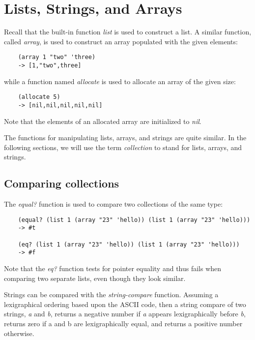 \chapter{Lists, Strings, and Arrays}
\label{ListsStringsArrays}

Recall that the built-in function {\it list} is used to construct a list.
A similar function, called {\it array}, is used to construct an array populated
with the given elements:

\begin{verbatim}
    (array 1 "two" 'three)
    -> [1,"two",three]
\end{verbatim}

while a function named {\it allocate} is used to allocate an array
of the given size:

\begin{verbatim}
    (allocate 5)
    -> [nil,nil,nil,nil,nil]
\end{verbatim}

Note that the elements of an allocated array are initialized to {\it nil}.

The functions for manipulating lists, arrays, and strings are quite
similar. In the following sections, we will use the term {\it collection}
to stand for lists, arrays, and strings.

\section{Comparing collections}

The {\it equal?} function is used to compare two collections of the same type:

\begin{verbatim}
    (equal? (list 1 (array "23" 'hello)) (list 1 (array "23" 'hello)))
    -> #t

    (eq? (list 1 (array "23" 'hello)) (list 1 (array "23" 'hello)))
    -> #f
\end{verbatim}

Note that the {\it eq?} function tests for pointer equality and thus fails
when comparing two separate lists, even though they look similar.

Strings can be compared with the {\it string-compare} function.
Assuming a lexigraphical ordering based upon the ASCII code,
then a string compare of two strings, {\it a} and {\it b},
returns a negative number if {\it a}
appears lexigraphically before {\it b}, returns zero if a and
b are lexigraphically equal,
and returns a positive number otherwise.

